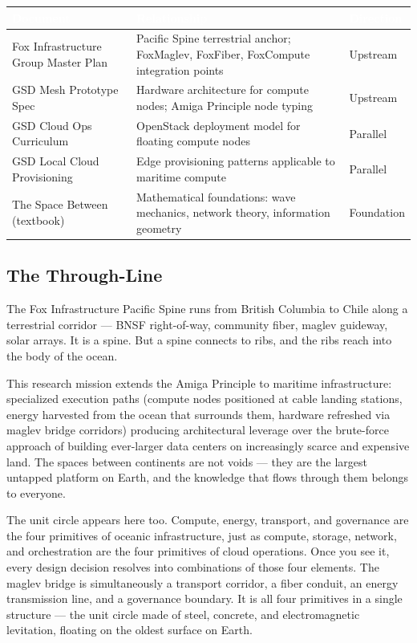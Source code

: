 \documentclass[11pt,letterpaper]{article}
\newcommand{\tableheader}[1]{\textbf{\sffamily\textcolor{white}{#1}}}
\begin{document}
\begin{center}
\begin{tabularx}{\textwidth}{L{4.5cm}XC{2cm}}
\toprule
{}
\tableheader{Document} & \tableheader{Relationship} & \tableheader{Direction} \\
\midrule
Fox Infrastructure Group Master Plan & Pacific Spine terrestrial anchor; FoxMaglev, FoxFiber, FoxCompute integration points & Upstream \\
GSD Mesh Prototype Spec & Hardware architecture for compute nodes; Amiga Principle node typing & Upstream \\
GSD Cloud Ops Curriculum & OpenStack deployment model for floating compute nodes & Parallel \\
GSD Local Cloud Provisioning & Edge provisioning patterns applicable to maritime compute & Parallel \\
The Space Between (textbook) & Mathematical foundations: wave mechanics, network theory, information geometry & Foundation \\
\bottomrule
\end{tabularx}
\end{center}

\subsection{The Through-Line}

The Fox Infrastructure Pacific Spine runs from British Columbia to Chile along a terrestrial corridor --- BNSF right-of-way, community fiber, maglev guideway, solar arrays. It is a spine. But a spine connects to ribs, and the ribs reach into the body of the ocean.

This research mission extends the Amiga Principle to maritime infrastructure: specialized execution paths (compute nodes positioned at cable landing stations, energy harvested from the ocean that surrounds them, hardware refreshed via maglev bridge corridors) producing architectural leverage over the brute-force approach of building ever-larger data centers on increasingly scarce and expensive land. The spaces between continents are not voids --- they are the largest untapped platform on Earth, and the knowledge that flows through them belongs to everyone.

The unit circle appears here too. Compute, energy, transport, and governance are the four primitives of oceanic infrastructure, just as compute, storage, network, and orchestration are the four primitives of cloud operations. Once you see it, every design decision resolves into combinations of those four elements. The maglev bridge is simultaneously a transport corridor, a fiber conduit, an energy transmission line, and a governance boundary. It is all four primitives in a single structure --- the unit circle made of steel, concrete, and electromagnetic levitation, floating on the oldest surface on Earth.
\end{document}
